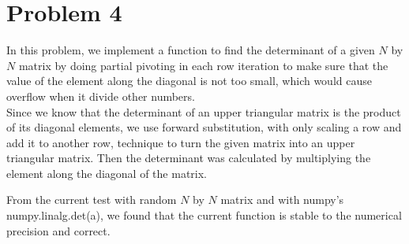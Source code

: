 \documentclass{scrartcl}
\begin{document}
\section*{Problem 4}
In this problem, we implement a function to find the determinant of a given $N$ by $N$ matrix by doing partial pivoting in each row iteration to make sure that the value of the element along the diagonal is not too small, which would cause overflow when it divide other numbers.\\ 
Since we know that the determinant of an upper triangular matrix is the product of its diagonal elements, we use forward substitution, with only scaling a row and add it to another row, technique to turn the given matrix into an upper triangular matrix. Then the determinant was calculated by multiplying the element along the diagonal of the matrix.

From the current test with random $N$ by $N$ matrix and with numpy's numpy.linalg.det(a), we found that the current function is stable to the numerical precision and correct.
\end{document}
